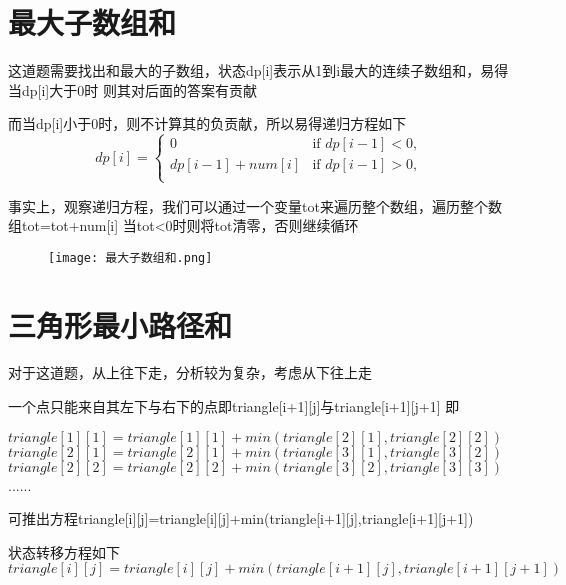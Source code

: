 \documentclass{article}
\begin{document}
\newpage
\section{最大子数组和}

这道题需要找出和最大的子数组，状态dp[i]表示从1到i最大的连续子数组和，易得当dp[i]大于0时
则其对后面的答案有贡献

而当dp[i]小于0时，则不计算其的负贡献，所以易得递归方程如下
\begin{equation}
    dp[i]=
    \begin{cases}
    0 & \text{if } dp[i-1] < 0,\\
    dp[i-1]+num[i] & \text{if } dp[i-1] > 0,\\
    \end{cases}
    \nonumber
\end{equation}


事实上，观察递归方程，我们可以通过一个变量tot来遍历整个数组，遍历整个数组tot=tot+num[i]
当tot<0时则将tot清零，否则继续循环
\begin{figure}[H]
    \begin{flushleft}
    \texttt{[image: 最大子数组和.png]}
    \end{flushleft}
\end{figure}



\newpage
\section{三角形最小路径和}
对于这道题，从上往下走，分析较为复杂，考虑从下往上走

一个点只能来自其左下与右下的点即triangle[i+1][j]与triangle[i+1][j+1]
即
\begin{center}
$triangle[1][1]=triangle[1][1]+min(triangle[2][1],triangle[2][2])$
$triangle[2][1]=triangle[2][1]+min(triangle[3][1],triangle[3][2])$
$triangle[2][2]=triangle[2][2]+min(triangle[3][2],triangle[3][3])$\\
......
\end{center}


可推出方程triangle[i][j]=triangle[i][j]+min(triangle[i+1][j],triangle[i+1][j+1])

状态转移方程如下
\begin{equation}
    triangle[i][j]=triangle[i][j]+min(triangle[i+1][j],triangle[i+1][j+1])
    \nonumber
\end{equation}
\end{document}
